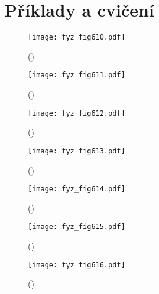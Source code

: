   \section{Příklady a cvičení}\label{fyz:IIchapXXVIIsecVII}





    \begin{figure}[ht!] %
      \centering
      \texttt{[image: fyz\_fig610.pdf]}
      \caption{
               (\cite[s.~707]{Feynman02})}
      \label{fyz:fig610}
    \end{figure}

    \begin{figure}[ht!] %
      \centering
      \texttt{[image: fyz\_fig611.pdf]}
      \caption{
               (\cite[s.~707]{Feynman02})}
      \label{fyz:fig611}
    \end{figure}

    \begin{figure}[ht!] %
      \centering
      \texttt{[image: fyz\_fig612.pdf]}
      \caption{
               (\cite[s.~707]{Feynman02})}
      \label{fyz:fig612}
    \end{figure}

    \begin{figure}[ht!] %
      \centering
      \texttt{[image: fyz\_fig613.pdf]}
      \caption{
               (\cite[s.~707]{Feynman02})}
      \label{fyz:fig613}
    \end{figure}

    \begin{figure}[ht!] %
      \centering
      \texttt{[image: fyz\_fig614.pdf]}
      \caption{
               (\cite[s.~707]{Feynman02})}
      \label{fyz:fig614}
    \end{figure}

    \begin{figure}[ht!] %
      \centering
      \texttt{[image: fyz\_fig615.pdf]}
      \caption{
               (\cite[s.~707]{Feynman02})}
      \label{fyz:fig615}
    \end{figure}

    \begin{figure}[ht!] %
      \centering
      \texttt{[image: fyz\_fig616.pdf]}
      \caption{
               (\cite[s.~707]{Feynman02})}
      \label{fyz:fig616}
    \end{figure}


